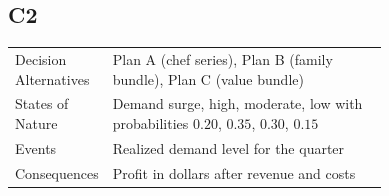 \begin{ExamProblems}
			\subsection*{C2}
			\begin{center}
				\begin{tabular}{l p{0.74\linewidth}}
					\toprule
					Decision Alternatives & Plan A (chef series), Plan B (family bundle), Plan C (value bundle) \\
					States of Nature & Demand surge, high, moderate, low with probabilities $0.20$, $0.35$, $0.30$, $0.15$ \\
					Events & Realized demand level for the quarter \\
					Consequences & Profit in dollars after revenue and costs \\
					\bottomrule
				\end{tabular}
			\end{center}
	

\end{ExamProblems}
